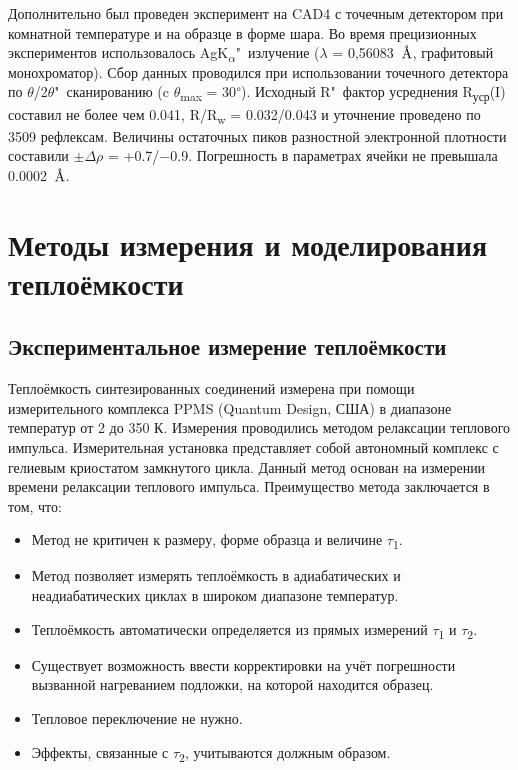 Дополнительно был проведен эксперимент на CAD4 с точечным детектором при комнатной температуре и на образце в форме шара. Во время прецизионных экспериментов использовалось AgK\textsubscript{$\alpha$}"~излучение ($\lambda$ = 0,56083~${\mbox{\normalfont\AA}}$, графитовый монохроматор). Сбор данных проводился при использовании точечного детектора по $\theta$/2$\theta$"~сканированию (c $\theta$\textsubscript{max} = 30\textsuperscript{$\circ$}).
Исходный R"~фактор усреднения R\textsubscript{уср}(I) составил не более чем  0.041, R/R\textsubscript{w} = 0.032/0.043 и уточнение проведено по 3509 рефлексам.
Величины остаточных пиков разностной электронной плотности составили $\pm\Delta$$\rho$ = +0.7/$-$0.9.
Погрешность в параметрах ячейки не превышала 0.0002~{$\mbox{\normalfont\AA}$}.

\newpage
\section{Методы измерения и моделирования теплоёмкости} \label{sect2_4}
\subsection{Экспериментальное измерение теплоёмкости}\label{sect2_4_1}
Теплоёмкость синтезированных соединений измерена при помощи измерительного комплекса PPMS (Quantum Design,
США) в диапазоне температур от 2 до 350 К. Измерения проводились методом релаксации теплового
импульса\cite{Hwang_1997}. Измерительная установка представляет собой автономный комплекс с гелиевым криостатом замкнутого цикла. Данный метод основан на измерении времени релаксации теплового импульса. Преимущество метода заключается в том, что:
\begin{itemize}
\item Метод не критичен к размеру, форме образца и величине $\tau$\textsubscript{1}.

\item Метод позволяет измерять теплоёмкость в адиабатических и неадиабатических циклах в широком диапазоне температур.

\item Теплоёмкость автоматически определяется из прямых измерений  $\tau$\textsubscript{1} и $\tau$\textsubscript{2}.

\item Существует возможность ввести корректировки на учёт погрешности вызванной нагреванием подложки, на которой находится образец.

\item Тепловое переключение не нужно.

\item Эффекты, связанные с $\tau$\textsubscript{2}, учитываются должным образом.
\end{itemize}


